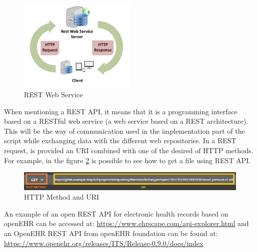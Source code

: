 \documentclass[mim_thesis.tex]{subfiles}
\begin{document}
\begin{figure}[H]
	\centering
    \includegraphics[width=0.5\textwidth]{img/rest_webservice.PNG}
	\caption{REST Web Service}
	\label{fig:rest_webservice}
\end{figure}

When mentioning a REST API, it means that it is a programming interface based on a RESTful web service (a web service based on a REST architecture). This will be the way of communication used in the implementation part of the script while exchanging data with the different web repositories. In a REST request, is provided an URI combined with one of the desired of HTTP methods. For example, in the figure \ref{fig:URI_methods} is possible to see how to get a file using REST API.  

\begin{figure}[H]
	\centering
    \includegraphics[width=1.05\textwidth]{img/URI_methods.PNG}
	\caption{HTTP Method and URI}
	\label{fig:URI_methods}
\end{figure}

An example of an open REST API for electronic health records based on openEHR can be accessed at: \url{https://www.ehrscape.com/api-explorer.html} and an OpenEHR REST API from openEHR foundation can be found at: \url{https://www.openehr.org/releases/ITS/Release-0.9.0/docs/index}

\newpage 
\end{document}
